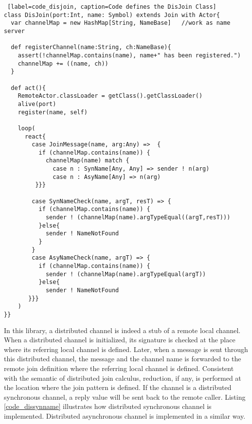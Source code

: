 \begin{lstlisting} [label=code_disjoin, caption=Code defines the DisJoin Class]
class DisJoin(port:Int, name: Symbol) extends Join with Actor{
  var channelMap = new HashMap[String, NameBase]   //work as name server
  
  def registerChannel(name:String, ch:NameBase){
    assert(!channelMap.contains(name), name+" has been registered.")
    channelMap += ((name, ch))
  }  
  
  def act(){
    RemoteActor.classLoader = getClass().getClassLoader()
    alive(port)
    register(name, self)
    
    loop(
      react{
        case JoinMessage(name, arg:Any) =>  {
          if (channelMap.contains(name)) {
            channelMap(name) match {
              case n : SynName[Any, Any] => sender ! n(arg)
              case n : AsyName[Any] => n(arg)
         }}}

        case SynNameCheck(name, argT, resT) => {
          if (channelMap.contains(name)) {
            sender ! (channelMap(name).argTypeEqual((argT,resT)))
          }else{
            sender ! NameNotFound
          }
        }
        case AsyNameCheck(name, argT) => {
          if (channelMap.contains(name)) {
            sender ! (channelMap(name).argTypeEqual(argT))
          }else{
            sender ! NameNotFound
       }}}
    )
}}
\end{lstlisting}

In this library, a distributed channel is indeed a stub of a remote local channel.  When a distributed channel is initialized, its signature is checked at the place where its referring local channel is defined.  Later, when a message is sent through this distributed channel, the message and the channel name is forwarded to the remote join definition where the  referring local channel is defined.  Consistent with the semantic of distributed join calculus, reduction, if any, is performed at the location where the join pattern is defined.  If the channel is a distributed synchronous channel, a reply value will be sent back to the remote caller.  Listing \ref{code_dissynname} illustrates how distributed synchronous channel is implemented.  Distributed asynchronous channel is implemented in a similar way.  


